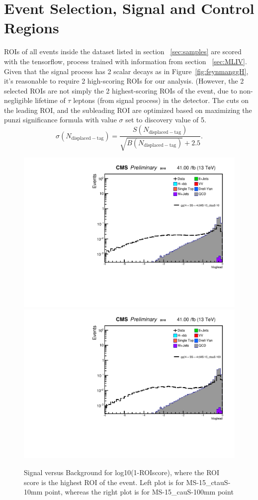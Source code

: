 \clearpage
\chapter{Event Selection, Signal and Control Regions}\label{sec:selections}

ROIs of all events inside the dataset listed in section ~\ref{sec:samples} are scored with the tensorflow, process trained with information from section ~\ref{sec:MLIV}.
Given that the signal process has 2 scalar decays as in Figure~\ref{fig:feynmanggH}, it's reasonable to require 2 high-scoring ROIs for our analysis.
(However, the 2 selected ROIs are not simply the 2 highest-scoring ROIs of the event, due to non-negligible lifetime of $\tau$ leptons (from signal process) in the detector.
The cuts on the leading ROI, and the subleading ROI are optimized based on maximizing the punzi significance formula with value $\sigma$ set to discovery value of 5.  
\begin{equation}\label{eq:significance}
    \sigma(N_{\mathrm{displaced-tag}}) = \frac{S(N_{\mathrm{displaced-tag}})} {\sqrt{B(N_{\mathrm{displaced-tag}})} + 2.5 }.
\end{equation}


 \begin{figure}[h!]
   \caption{Signal versus Background for log10(1-ROIscore), where the ROI score is the highest ROI of the event. Left plot is for MS-15\_ctauS-10mm point, whereas the right plot is for MS-15\_cauS-100mm point}
   \label{fig:leadROIscore}
   \centering
   \includegraphics[width=0.47\linewidth]{figs/AnalysisNoteplot_MS-15_ctauS-10_hloglead.pdf}
   \includegraphics[width=0.47\linewidth]{figs/AnalysisNoteplot_MS-15_ctauS-100_hloglead.pdf}
 \end{figure}


